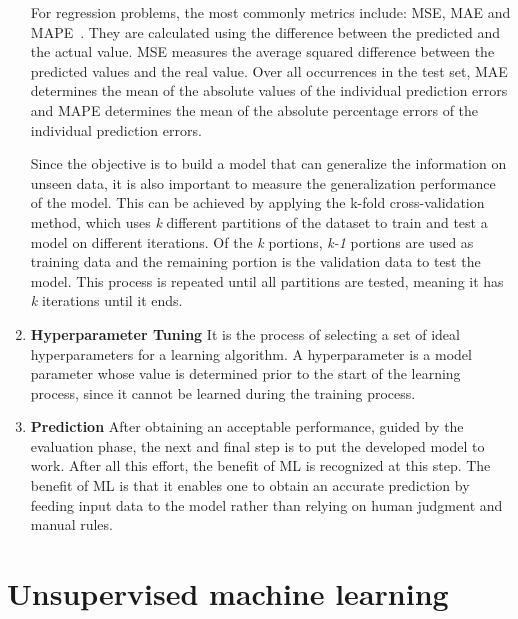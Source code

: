 \begin{enumerate}
\begin{table}[ht]
\begin{tabular}{p{2.5cm}cc}
    	\bottomrule
    \end{tabular}
    \end{table}
    
    For regression problems, the most commonly metrics include: \gls{MSE}, \gls{MAE} and \gls{MAPE}~\cite{Botchkarev2018PerformanceTypology}. They are calculated using the difference between the predicted and the actual value. \gls{MSE} measures the average squared difference between the predicted values and the real value. Over all occurrences in the test set, \gls{MAE} determines the mean of the absolute values of the individual prediction errors and \gls{MAPE} determines the mean of the absolute percentage errors of the individual prediction errors. 
    
    Since the objective is to build a model that can generalize the information on unseen data, it is also important to measure the generalization performance of the model. This can be achieved by applying the k-fold cross-validation method, which uses \textit{k} different partitions of the dataset to train and test a model on different iterations. Of the \textit{k} portions, \textit{k-1} portions are used as training data and the remaining portion is the validation data to test the model. This process is repeated until all partitions are tested, meaning it has \textit{k} iterations until it ends.
    
    \item \textbf{Hyperparameter Tuning} It is the process of selecting a set of ideal hyperparameters for a learning algorithm. A hyperparameter is a model parameter whose value is determined prior to the start of the learning process, since it cannot be learned during the training process.
    
    \item \textbf{Prediction} After obtaining an acceptable performance, guided by the evaluation phase, the next and final step is to put the developed model to work. After all this effort, the benefit of \gls{ML} is recognized at this step. The benefit of \gls{ML} is that it enables one to obtain an accurate prediction by feeding input data to the model rather than relying on human judgment and manual rules.

\end{enumerate}

\section{Unsupervised machine learning}

